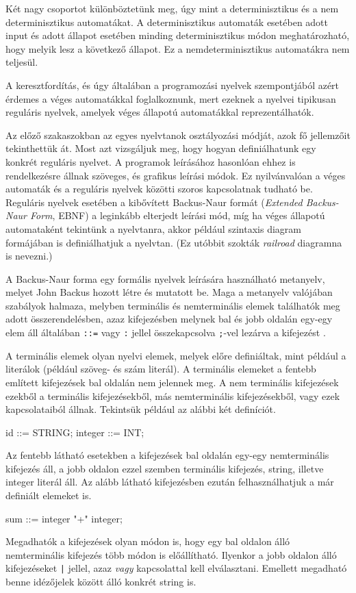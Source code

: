 Két nagy csoportot különböztetünk meg, úgy mint a determinisztikus és a nem determinisztikus automatákat.
A determinisztikus automaták esetében adott input és adott állapot esetében minding determinisztikus módon meghatározható, hogy melyik lesz a következő állapot. Ez a nemdeterminisztikus automatákra nem teljesül.

A keresztfordítás, és úgy általában a programozási nyelvek szempontjából azért érdemes a véges automatákkal foglalkoznunk, mert ezeknek a nyelvei tipikusan reguláris nyelvek, amelyek véges állapotú automatákkal reprezentálhatók.


Az előző szakaszokban az egyes nyelvtanok osztályozási módját, azok fő jellemzőit tekinthettük át.
Most azt vizsgáljuk meg, hogy hogyan definiálhatunk egy konkrét reguláris nyelvet.
A programok leírásához hasonlóan ehhez is rendelkezésre állnak szöveges, és grafikus leírási módok.
Ez nyilvánvalóan a véges automaták és a reguláris nyelvek közötti szoros kapcsolatnak tudható be.
Reguláris nyelvek esetében a kibővített Backus-Naur formát (\textit{Extended Backus-Naur Form}, EBNF) a leginkább elterjedt leírási mód, míg ha véges állapotú automataként tekintünk a nyelvtanra, akkor például szintaxis diagram formájában is definiálhatjuk a nyelvtan. (Ez utóbbit szokták \textit{railroad} diagramna is nevezni.)


A Backus-Naur forma egy formális nyelvek leírására használható metanyelv, melyet John Backus hozott létre és mutatott be. Maga a metanyelv valójában szabályok halmaza, melyben terminális és nemterminális elemek találhatók meg adott összerendelésben, azaz kifejezésben melynek bal és jobb oldalán egy-egy elem áll általában \texttt{::=} vagy \texttt{:} jellel összekapcsolva \texttt{;}-vel lezárva a kifejezést \cite{ebnf}.

A terminális elemek olyan nyelvi elemek, melyek előre definiáltak, mint például a literálok (például szöveg- és szám literál).
A terminális elemeket a fentebb említett kifejezések bal oldalán nem jelennek meg.
A nem terminális kifejezések ezekből a terminális kifejezésekből, más nemterminális kifejezésekből, vagy ezek kapcsolataiból állnak. Tekintsük például az alábbi két definíciót.
\begin{cpp}
id ::= STRING;
integer ::= INT;
\end{cpp}
Az fentebb látható esetekben a kifejezések bal oldalán egy-egy nemterminális kifejezés áll, a jobb oldalon ezzel szemben terminális kifejezés, string, illetve integer literál áll. Az alább látható kifejezésben ezután felhasználhatjuk a már definiált elemeket is.
\begin{cpp}
sum ::=	integer "+" integer;
\end{cpp}
Megadhatók a kifejezések olyan módon is, hogy egy bal oldalon álló nemterminális kifejezés több módon is előállítható. Ilyenkor a jobb oldalon álló kifejezéseket \texttt{|} jellel, azaz \textit{vagy} kapcsolattal kell elválasztani. Emellett megadható benne idézőjelek között álló konkrét string is.

